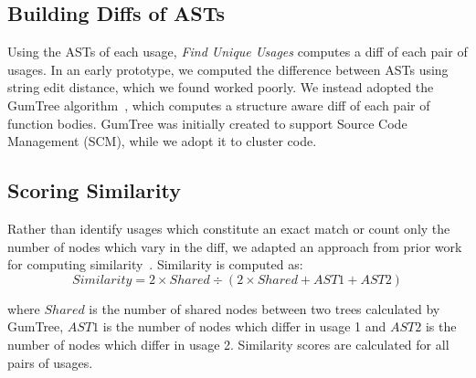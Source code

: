\documentclass[conference]{IEEEtran}
\begin{document}




\subsection{Building Diffs of ASTs}

Using the ASTs of each usage, \textit{Find Unique Usages} computes a diff of each pair of usages. In an early prototype, we computed the difference between ASTs using string edit distance, which we found worked poorly. We instead adopted the GumTree algorithm~\cite{baxter1998clone,DBLP:conf/kbse/FalleriMBMM14,falleri2014fine}, which computes a structure aware diff of each pair of function bodies. GumTree was initially created to support Source Code Management (SCM), while we adopt it to cluster code. \par

\subsection{Scoring Similarity}
Rather than identify usages which constitute an exact match or count only the number of nodes which vary in the diff, we adapted an approach from prior work for computing similarity~\cite{baxter1998clone}. 
Similarity is computed as:
\begin{equation}
Similarity = 2 \times Shared  \div (2  \times Shared  + AST1 + AST2)
\label{equation1}
\end{equation}

\noindent where $Shared$ is the number of shared nodes between two trees calculated by GumTree, $AST1$ is the number of nodes which differ in usage  1 and $AST2$ is the number of nodes which differ in usage 2.
Similarity scores are calculated for all pairs of usages. 
\end{document}
